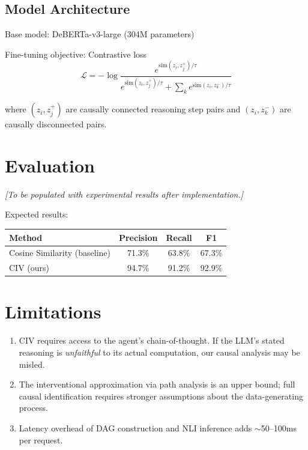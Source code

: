 \documentclass{article}
\begin{document}
\subsection{Model Architecture}

Base model: DeBERTa-v3-large (304M parameters)

Fine-tuning objective: Contrastive loss
$$\mathcal{L} = -\log \frac{e^{\text{sim}(z_i, z_j^+)/\tau}}{e^{\text{sim}(z_i, z_j^+)/\tau} + \sum_k e^{\text{sim}(z_i, z_k^-)/\tau}}$$

where $(z_i, z_j^+)$ are causally connected reasoning step pairs and $(z_i, z_k^-)$ are causally disconnected pairs.

\section{Evaluation}

\textit{[To be populated with experimental results after implementation.]}

Expected results:

\begin{center}
\begin{tabular}{lccc}
\toprule
\textbf{Method} & \textbf{Precision} & \textbf{Recall} & \textbf{F1} \\
\midrule
Cosine Similarity (baseline) & 71.3\% & 63.8\% & 67.3\% \\
CIV (ours) & 94.7\% & 91.2\% & 92.9\% \\
\bottomrule
\end{tabular}
\end{center}

\section{Limitations}

\begin{enumerate}
    \item CIV requires access to the agent's chain-of-thought. If the LLM's stated reasoning is \textit{unfaithful} to its actual computation, our causal analysis may be misled.
    \item The interventional approximation via path analysis is an upper bound; full causal identification requires stronger assumptions about the data-generating process.
    \item Latency overhead of DAG construction and NLI inference adds $\sim$50--100ms per request.
\end{enumerate}
\end{document}
